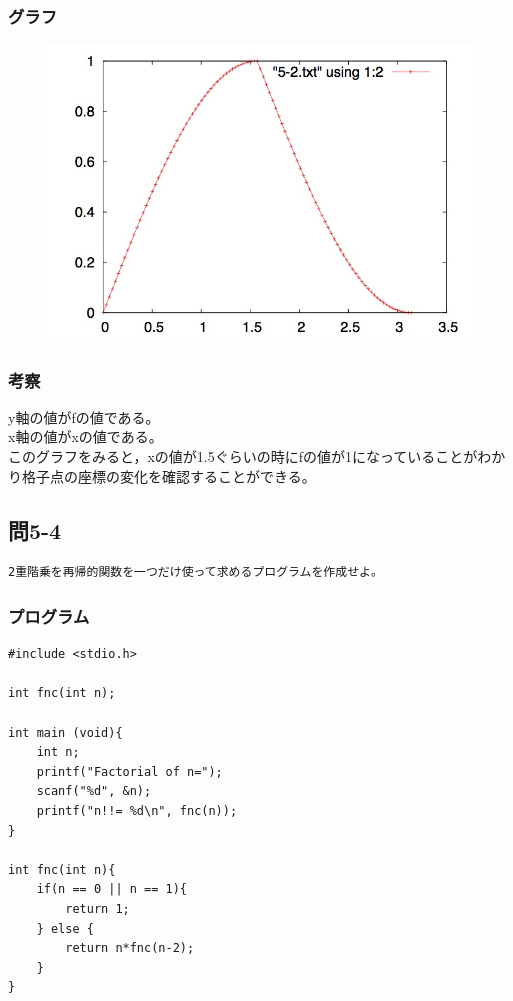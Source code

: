 \documentclass{jarticle}
\begin{document}
\subsubsection{グラフ\\}
\begin{figure}[htb]
 \begin{center}
 \includegraphics[clip, width=15cm]{5-2.jpg} 
  \label{fig:level}
 \end{center}
\end{figure}
\subsubsection{考察\\}
y軸の値がfの値である。\\
x軸の値がxの値である。\\
このグラフをみると，xの値が1.5ぐらいの時にfの値が1になっていることがわかり格子点の座標の変化を確認することができる。\\

\subsection{問5-4\\}
\begin{verbatim}
2重階乗を再帰的関数を一つだけ使って求めるプログラムを作成せよ。
\end{verbatim}
\subsubsection{プログラム\\}
\begin{breakbox}
\begin{verbatim}
#include <stdio.h>

int fnc(int n);

int main (void){
    int n;
    printf("Factorial of n=");
    scanf("%d", &n);
    printf("n!!= %d\n", fnc(n));
}

int fnc(int n){
    if(n == 0 || n == 1){
        return 1;
    } else {
        return n*fnc(n-2);
    }
}
\end{verbatim}
\end{breakbox}
\end{document}
